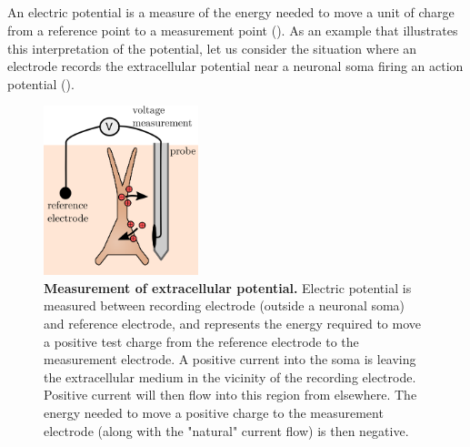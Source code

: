 \subsection{}
\label{sec:Basics:interp_pot_brain}

An electric potential is a measure of the energy needed to move a  unit of charge from a reference point to a measurement point (). As an example that illustrates this interpretation of the potential, let us consider the situation where an electrode records the extracellular potential near a neuronal soma firing an action potential (). 

\begin{figure}[!ht]
\begin{center}
\includegraphics[width=0.4\textwidth]{Figures/Basics/rec_elec_circuit.png}
\end{center}
\caption[]{\textbf{Measurement of extracellular potential.}
Electric potential is measured between recording electrode (outside a neuronal soma) and reference electrode, and represents the energy required to move a positive test charge from the reference electrode to the measurement electrode. A positive current into the soma is leaving the extracellular medium in the vicinity of the recording electrode. Positive current will then flow into this region from elsewhere. The energy needed to move a positive charge to the measurement electrode (along with the "natural" current flow) is then negative.
}
\label{fig:Basics:elec_circuit}
\end{figure}

